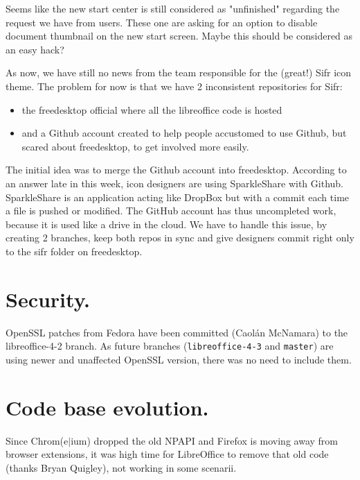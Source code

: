 \documentclass{article}
\begin{document}
Seems like the new start center is still considered as "unfinished"
regarding the request we have from users. These one are asking for an
option to disable document thumbnail on the new start screen\cite{startCenterHidePreview1}\cite{startCenterHidePreview2}. Maybe this should be considered as an easy hack?

As now, we have still no news from the team responsible for the (great!) Sifr icon theme. The problem for now is that we have 2 inconsistent repositories for Sifr:
\begin{itemize}
\item the freedesktop official where all the libreoffice code is hosted
\item and a Github account created to help people accustomed to use Github, but scared about freedesktop, to get involved more easily.
\end{itemize}

The initial idea was to merge the Github account into freedesktop. According to an answer late in this week\cite{sifrGithub1}, icon designers are using SparkleShare with Github. SparkleShare is an application acting like DropBox but with a commit each time a file is pushed or modified. The GitHub account has thus uncompleted work, because it is used like a drive in the cloud. We have to handle this issue, by creating 2 branches, keep both repos in sync and give designers commit right only to the sifr folder on freedesktop.

\section{Security.}

OpenSSL patches from Fedora have been committed\cite{opensslPatches} (Caolán McNamara) to the libreoffice-4-2 branch. As future branches (\lstinline{libreoffice-4-3} and \lstinline{master}) are using newer and unaffected OpenSSL version, there was no need to include them.

\section{Code base evolution.}

Since Chrom(e$\vert$ium) dropped the old NPAPI and Firefox is moving away from
browser extensions\cite{npapiMozilla}, it was high time for LibreOffice to remove that
old code\cite{removeNpapiPatch} (thanks Bryan Quigley), not working in some scenarii\cite{npapiLibONotWorking}.
\end{document}
